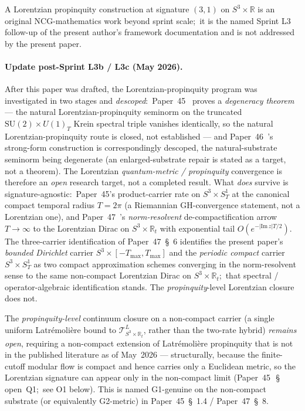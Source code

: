 \documentclass[11pt,a4paper]{article}
\theoremstyle{plain}
\theoremstyle{definition}
\newcommand{\sthree}{S^{3}}
\newcommand{\Tcal}{\mathcal{T}}
\newcommand{\R}{\mathbb{R}}
\newcommand{\SU}{\mathrm{SU}}
\begin{document}
A Lorentzian propinquity construction at signature $(3, 1)$ on
$\sthree \times \R$ is an original NCG-mathematics work beyond sprint
scale;\ it is the named Sprint L3 follow-up of the present author's
framework documentation and is not addressed by the present paper.

\paragraph*{Update post-Sprint L3b / L3c (May 2026).}
After this paper was drafted, the Lorentzian-propinquity program was
investigated in two stages and \emph{descoped}:\
Paper~45~\cite{paper45} proves a \emph{degeneracy theorem} --- the
natural Lorentzian-propinquity seminorm on the truncated
$\SU(2) \times U(1)_{T}$ Krein spectral triple vanishes identically,
so the natural Lorentzian-propinquity route is closed, not
established --- and Paper~46~\cite{paper46}'s strong-form construction
is correspondingly descoped, the natural-substrate seminorm being
degenerate (an enlarged-substrate repair is stated as a target, not a
theorem). The Lorentzian \emph{quantum-metric / propinquity}
convergence is therefore an \emph{open} research target, not a
completed result. What \emph{does} survive is signature-agnostic:\
Paper~45's product-carrier rate on $\sthree \times S^{1}_{T}$ at the
canonical compact temporal radius $T = 2\pi$ (a Riemannian
GH-convergence statement, not a Lorentzian one), and
Paper~47~\cite{paper47}'s \emph{norm-resolvent} de-compactification
arrow $T \to \infty$ to the Lorentzian Dirac on
$\sthree\times\R_{t}$ with exponential tail
$O(e^{-|\mathrm{Im}\,z|T/2})$. The three-carrier identification of
Paper~47~\S~6 identifies the present paper's \emph{bounded Dirichlet}
carrier $\sthree \times [-T_{\max}, T_{\max}]$ and the \emph{periodic
compact} carrier $\sthree \times S^{1}_{T}$ as two compact
approximation schemes converging in the norm-resolvent sense to the
same non-compact Lorentzian Dirac on $\sthree \times \R_{t}$;\ that
spectral / operator-algebraic identification stands. The
\emph{propinquity}-level Lorentzian closure does not.

The \emph{propinquity-level} continuum closure on a non-compact
carrier (a single uniform Latr\'emoli\`ere bound to
$\Tcal_{\sthree \times \R_{t}}^{L}$, rather than the two-rate hybrid)
\emph{remains open}, requiring a non-compact extension of
Latr\'emoli\`ere propinquity that is not in the published literature
as of May~2026 --- structurally, because the finite-cutoff modular flow
is compact and hence carries only a Euclidean metric, so the Lorentzian
signature can appear only in the non-compact limit (Paper~45~\cite{paper45}\,\S\,open~Q1;\
see O1 below). This is named G1-genuine on the non-compact substrate
(or equivalently G2-metric) in Paper~45~\S~1.4 / Paper~47~\S~8.
\end{document}
